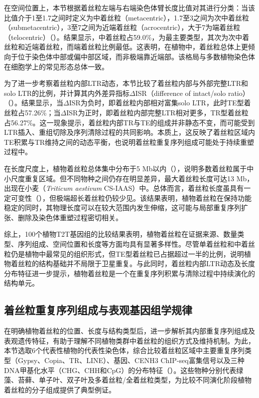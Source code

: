 在空间位置上，本节根据着丝粒左端与右端染色体臂长度比值对其进行分类：当该比值介于1至1.7之间时定义为中着丝粒（metacentric），1.7至3之间为次中着丝粒（submetacentric），3至7之间为近端着丝粒（acrocentric），大于7为端着丝粒（telocentric）（）。结果显示，中着丝粒占59.0\%，为最主要类型，其次为次中着丝粒和近端着丝粒，而端着丝粒比例最低。这表明，在植物中，着丝粒总体上更倾向于位于染色体中部或偏中部区域，而非极端靠近端部。该格局与多数植物染色体在细胞学上的常见形态总体一致。

为了进一步考察着丝粒内部LTR动态，本节比较了着丝粒内部与外部完整LTR和solo LTR的比例，并计算其内外差异指标$\Delta$ISR（difference of intact/solo ratio）（）。结果显示，当$\Delta$ISR为负时，即着丝粒内部相对富集solo LTR，此时TE型着丝粒占57.26\%；当$\Delta$ISR为正时，即着丝粒内部完整LTR相对更多，TR型着丝粒占56.27\%。这一现象提示，着丝粒内部TR与TE的组成并非静态不变，而可能受到LTR插入、重组切除及序列清除过程的共同影响。本质上，这反映了着丝粒区域内TE积累与TR维持之间的动态平衡，也说明着丝粒重复序列组成可能处于持续重塑过程中。

在长度尺度上，植物着丝粒总体集中分布于5 Mb以内（），说明多数着丝粒属于中小尺度重复区域。但不同物种之间仍存在明显差异，最大着丝粒长度可达13 Mb，出现在小麦（\textit{Triticum aestivum} CS-IAAS）中。总体而言，着丝粒长度虽具有一定可变性（），但极端超长着丝粒仍较少见。该结果表明，植物着丝粒在保持功能稳定的同时，其物理长度可以在较大范围内发生伸缩，这可能与局部重复序列扩张、删除及染色体重塑过程密切相关。

综上，100个植物T2T基因组的比较结果表明，植物着丝粒在证据来源、数量类型、序列组成、空间位置和长度等方面均具有显著多样性。尽管单着丝粒和中着丝粒仍是植物中最常见的组织形式，但TE型着丝粒已占据超过一半的比例，说明植物着丝粒的结构基础并不局限于卫星重复。与此同时，着丝粒内部LTR动态及长度分布特征进一步提示，植物着丝粒是一个在重复序列积累与清除过程中持续演化的结构单元。

\subsection{着丝粒重复序列组成与表观基因组学规律}

在明确植物着丝粒的位置、长度与结构类型后，进一步解析其内部重复序列组成及表观遗传特征，有助于理解不同植物类群中着丝粒的组织方式及维持机制。为此，本节选取6个代表性植物的代表性染色体，综合比较着丝粒区域中主要重复序列类型（Gypsy、Copia、TR、LINE）、基因、CENH3 ChIP-seq富集信号以及三种DNA甲基化水平（CHG、CHH和CpG）的分布特征（）。这些物种分别代表绿藻、苔藓、单子叶、双子叶及多着丝粒/全着丝粒类型，为比较不同演化阶段植物着丝粒的分子组成提供了典型例证。

